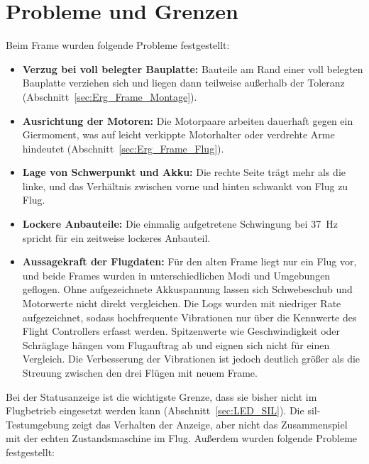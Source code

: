     \section{Probleme und Grenzen}
    \label{sec:Diskussion_Grenzen}

    Beim Frame wurden folgende Probleme festgestellt:

    \begin{itemize}
        \item \textbf{Verzug bei voll belegter Bauplatte:} Bauteile am Rand einer voll belegten Bauplatte verziehen
        sich und liegen dann teilweise außerhalb der Toleranz (Abschnitt~\ref{sec:Erg_Frame_Montage}).
        \item \textbf{Ausrichtung der Motoren:} Die Motorpaare arbeiten dauerhaft gegen ein Giermoment, was auf leicht
        verkippte Motorhalter oder verdrehte Arme hindeutet (Abschnitt~\ref{sec:Erg_Frame_Flug}).
        \item \textbf{Lage von Schwerpunkt und Akku:} Die rechte Seite trägt mehr als die linke, und das Verhältnis
        zwischen vorne und hinten schwankt von Flug zu Flug.
        \item \textbf{Lockere Anbauteile:} Die einmalig aufgetretene Schwingung bei \SI{37}{\hertz} spricht für ein
        zeitweise lockeres Anbauteil.
        \item \textbf{Aussagekraft der Flugdaten:} Für den alten Frame liegt nur ein Flug vor, und beide Frames wurden in
        unterschiedlichen Modi und Umgebungen geflogen. Ohne aufgezeichnete Akkuspannung lassen sich Schwebeschub und
        Motorwerte nicht direkt vergleichen. Die Logs wurden mit niedriger Rate aufgezeichnet, sodass hochfrequente
        Vibrationen nur über die Kennwerte des Flight Controllers erfasst werden. Spitzenwerte wie Geschwindigkeit oder
        Schräglage hängen vom Flugauftrag ab und eignen sich nicht für einen Vergleich. Die Verbesserung der Vibrationen
        ist jedoch deutlich größer als die Streuung zwischen den drei Flügen mit neuem Frame.
    \end{itemize}

    Bei der Statusanzeige ist die wichtigste Grenze, dass sie bisher nicht im Flugbetrieb eingesetzt werden kann
    (Abschnitt~\ref{sec:LED_SIL}).
    Die \gls{sil}-Testumgebung zeigt das Verhalten der Anzeige, aber nicht das Zusammenspiel mit der echten
    Zustandsmaschine im Flug.
    Außerdem wurden folgende Probleme festgestellt:

